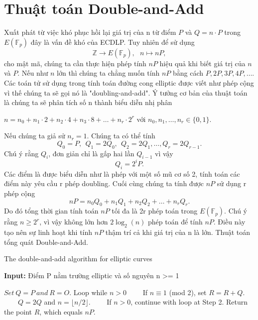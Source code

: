 \documentclass[a4paper,12pt]{report}
\begin{document}
\section{Thuật toán Double-and-Add}
Xuất phát từ việc khó phục hồi lại giá trị của n từ điểm $P$ và $Q = n\cdot P$ trong $E(\mathbb{F}_{p})$ đây là vấn đề khó của ECDLP. Tuy nhiên để sử dụng
\begin{displaymath}
\mathbb{Z} \rightarrow E(\mathbb{F}_p), \ \ \ n \mapsto nP,
\end{displaymath}
cho mật mã, chúng ta cần thực hiện phép tính $nP$ hiệu quả khi biết giá trị của $n$ và $P$. Nếu như $n$ lớn thì chúng ta chẳng muốn tính $nP$ bằng cách $P, 2P, 3P, 4P, \ldots .$
Các toán tử sử dụng trong tính toán đường cong elliptic được viết như phép cộng vì thế chúng ta sẽ gọi nó là "doubling-and-add". Ý tưởng cơ bản của thuật toán là chúng ta sẽ phân tích số n thành biểu diễn nhị phân
\begin{center}
$n = n_0 + n_1\cdot2 + n_2\cdot4 + n_3\cdot8 + \ldots + n_r\cdot2^r$ với $n_0, n_1, \ldots , n_r \in \{0, 1\}$.
\end{center}
Nếu chúng ta giả sử $n_r = 1$. Chúng ta có thể tính
\begin{displaymath}
Q_0 = P, \ \ Q_1 = 2Q_0, \ \ Q_2 = 2Q_1, \ldots , Q_r = 2Q_{r - 1}.
\end{displaymath}
Chú ý rằng $Q_i$, đơn giản chỉ là gấp hai lần $Q_{i-1}$ vì vậy 
\begin{displaymath}
Q_i = 2^iP.
\end{displaymath}
Các điểm là được biểu diễn như là phép với một số mũ cơ số 2, tính toán các điểm này yêu cầu r phép doubling. Cuối cùng chúng ta tính được $nP$ sử dụng r phép cộng
\begin{displaymath}
nP = n_0Q_0 + n_1Q_1 + n_2Q_2 + \ldots + n_rQ_r.
\end{displaymath}
Do đó tổng thời gian tính toán $nP$ tối đa là 2r phép toán trong $E(\mathbb{F}_p)$. Chú ý rằng $n \geq 2^r$, vì vậy không lớn hơn $2\log_2(n)$ phép toán để tính $nP$. Điều này tạo nên sự linh hoạt khi tính $nP$ thậm trí cả khi giá trị của n là lớn. Thuật toán tổng quát Double-and-Add.
\begin{algorithm}[H]
\caption{The double-and-add algorithm for elliptic curves}
\textbf{Input:} Điểm P nằm trường elliptic và số nguyên n >= 1
\begin{algorithmic}[1]
\State $Set \ Q = P \ and \  R = O$.
\State Loop while $n > 0$
\State \ \ \ \ If $n \equiv 1$ (mod 2), set $R = R + Q$.
\State \ \ \ \ $Q = 2Q$ and $n = \lfloor n/2 \rfloor$.
\State \ \ \ \ If $n > 0$, continue with loop at Step 2.
\State Return the point $R$, which equals $nP$.
\end{algorithmic}
\end{algorithm}
\end{document}

